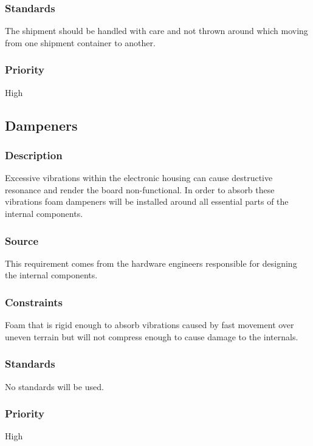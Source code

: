 \subsubsection{Standards}
The shipment should be handled with care and not thrown around which moving from one shipment container to another.
\subsubsection{Priority}
High

\subsection{Dampeners}
\subsubsection{Description}
Excessive vibrations within the electronic housing can cause destructive resonance and render the board non-functional. In order to absorb these vibrations foam dampeners will be installed around all essential parts of the internal components.
\subsubsection{Source}
This requirement comes from the hardware engineers responsible for designing the internal components.
\subsubsection{Constraints}
Foam that is rigid enough to absorb vibrations caused by fast movement over uneven terrain but will not compress enough to cause damage to the internals.
\subsubsection{Standards}
No standards will be used.
\subsubsection{Priority}
High
